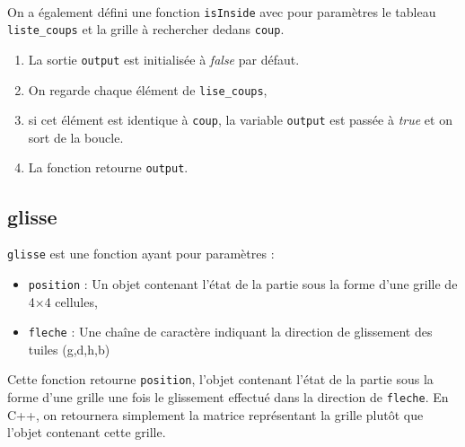 \documentclass[a4paper]{report}
\begin{document}
\paragraph{}On a également défini une fonction \verb|isInside| avec pour paramètres le tableau \verb|liste_coups| et la grille à rechercher dedans \verb|coup|.
\begin{enumerate}
\item La sortie \verb|output| est initialisée à \emph{false} par défaut.
\item On regarde chaque élément de \verb|lise_coups|,
\item si cet élément est identique à \verb|coup|, la variable \verb|output| est passée à \emph{true} et on sort de la boucle.
\item La fonction retourne \verb|output|. 
\end{enumerate}




\subsection{glisse}
\verb|glisse| est une fonction ayant pour paramètres : 
\begin{itemize}
\item \verb|position| : Un objet contenant l'état de la partie sous la forme d'une grille de 4$\times$4 cellules,
\item \verb|fleche| : Une chaîne de caractère indiquant la direction de glissement des tuiles (g,d,h,b)
\end{itemize}
Cette fonction retourne \verb|position|, l'objet contenant l'état de la partie sous la forme d'une grille une fois le glissement effectué dans la direction de \verb|fleche|. En C++, on retournera simplement la matrice représentant la grille plutôt que l'objet contenant cette grille.
\end{document}
